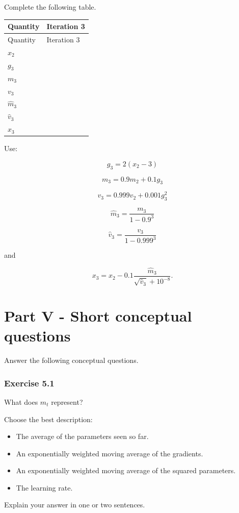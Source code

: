 \documentclass{course_sheet}
\begin{document}
Complete the following table.

\begingroup
\small
\setlength{\tabcolsep}{4pt}
\begin{longtable}{l|l}
Quantity & Iteration 3 \\[1.5pt]
\hline
\endfirsthead
Quantity & Iteration 3 \\[1.5pt]
\hline
\endhead
\rule{0pt}{2.4ex}$x_2$ &  $\phantom{-0.00}$ \\[3pt]
\rule{0pt}{2.4ex}$g_3$ &  $\phantom{-0.00}$ \\[3pt]
\rule{0pt}{2.4ex}$m_3$ &  $\phantom{-0.00}$ \\[3pt]
\rule{0pt}{2.4ex}$v_3$ &  $\phantom{-0.00}$ \\[3pt]
\rule{0pt}{2.4ex}$\hat m_3$ &  $\phantom{-0.00}$ \\[3pt]
\rule{0pt}{2.4ex}$\hat v_3$ &  $\phantom{-0.00}$ \\[3pt]
\rule{0pt}{2.4ex}$x_3$ &  $\phantom{-0.00}$ \\[3pt]
\end{longtable}
\endgroup
Use:

\[
g_3 = 2(x_2-3)
\]

\[
m_3 = 0.9m_2+0.1g_3
\]

\[
v_3 = 0.999v_2+0.001g_3^2
\]

\[
\hat m_3=\frac{m_3}{1-0.9^3}
\]

\[
\hat v_3=\frac{v_3}{1-0.999^3}
\]

and

\[
x_3 =
x_2 -
0.1
\frac{\hat m_3}
{\sqrt{\hat v_3}+10^{-8}}.
\]

\clearpage
\section*{Part V - Short conceptual questions}
Answer the following conceptual questions.

\subsubsection*{Exercise 5.1}
What does $m_t$ represent?

Choose the best description:

\begin{itemize}
\item
[ ] The average of the parameters seen so far.

\item
[ ] An exponentially weighted moving average of the gradients.

\item
[ ] An exponentially weighted moving average of the squared parameters.

\item
[ ] The learning rate.

\end{itemize}
Explain your answer in one or two sentences.
\end{document}
